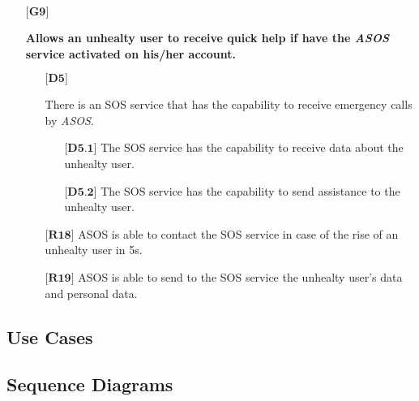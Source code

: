 \begin{itemize}
	\item[${\textbf{[G9]}}$] {\textbf{Allows an unhealty user to receive quick help if have the \hbox{\emph{ASOS}} service activated on his/her account.}
		\begin{itemize}
			\item[$\textbf{[D5]}$] {There is an SOS service that has the capability to receive emergency calls by \hbox{\emph{ASOS}}.
				\begin{itemize}
					\item[$\textbf{[D5.1]}$] {The SOS service has the capability to receive data about the unhealty user.}
					\item[$\textbf{[D5.2]}$] {The SOS service has the capability to send assistance to the unhealty user.}
				\end{itemize}}
			\item[$\textbf{[R18]}$] {ASOS is able to contact the SOS service in case of the rise of an unhealty user in 5s.}
			\item[$\textbf{[R19]}$] {ASOS is able to send to the SOS service the unhealty user's data and personal data.}
		\end{itemize}}
\end{itemize}

\subsection{Use Cases}

\subsection{Sequence Diagrams}
